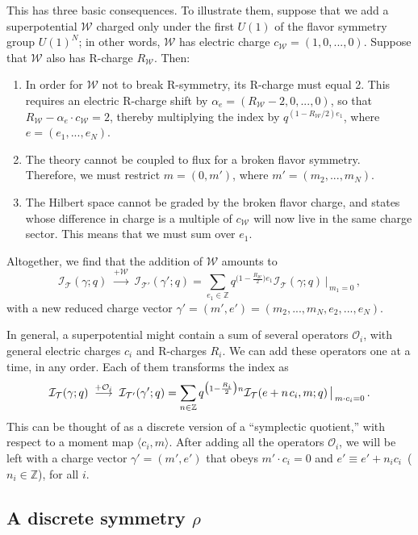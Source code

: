 \documentclass[11pt,letterpaper]{article}
\numberwithin{equation}{section}
\newcommand{\be}{\begin{equation}}
\newcommand{\ee}{\end{equation}}
\newcommand{\Z}{{\mathbb Z}}
\newcommand{\CI}{\mathcal{I}}
\newcommand{\CO}{\mathcal{O}}
\newcommand{\CT}{\mathcal{T}}
\newcommand{\CW}{\mathcal{W}}
\begin{document}
This has three basic consequences. To illustrate them, suppose that we add a superpotential $\CW$ charged only under the first $U(1)$ of the flavor symmetry group $U(1)^N$; in other words, $\CW$ has electric charge $c_\CW = (1,0,...,0)$. Suppose that $\CW$ also has R-charge $R_\CW$. Then:
%
\begin{enumerate}

\item In order for $\CW$ not to break R-symmetry, its R-charge must equal 2. This requires an electric R-charge shift by $\alpha_e = (R_\CW-2,0,...,0)$, so that $R_\CW - \alpha_e\cdot c_\CW=2$, thereby multiplying the index by $q^{(1-R_\CW/2)e_1}$, where $e = (e_1,...,e_N)$.

\item The theory cannot be coupled to flux for a broken flavor symmetry. Therefore, we must restrict $m=(0,m')$, where $m'=(m_2,...,m_N)$.

\item The Hilbert space cannot be graded by the broken flavor charge, and states whose difference in charge is a multiple of $c_\CW$ will now live in the same charge sector. This means that we must sum over $e_1$.

\end{enumerate}
%
Altogether, we find that the addition of $\CW$ amounts to
%
\be \CI_\CT(\gamma;q)\;\overset{+\CW}{\longrightarrow}\; \CI_{\CT'}(\gamma';q) = \sum_{e_1\in \Z}q^{\big(1-\frac{R_\CW}{2}\big)e_1} \CI_\CT(\gamma;q)\,\big|_{\,m_1=0}\,, \ee
%
with a new reduced charge vector $\gamma' = (m',e') = (m_2,...,m_N,e_2,...,e_N)$.

In general, a superpotential might contain a sum of several operators $\CO_i$, with general electric charges $c_i$ and R-charges $R_i$. We can add these operators one at a time, in any order. Each of them transforms the index as
%
\be \CI_\CT(\gamma;q)\;\overset{+\CO_i}{\longrightarrow}\; \CI_{\CT'}(\gamma';q) = \sum_{n\in \Z} q^{\big(1-\frac{R_i}{2}\big)n}\CI_\CT(e+n\hspace{.04cm}c_i,m;q)\,\big|_{\,m\cdot c_i = 0}\,. \ee
%
This can be thought of as a discrete version of a ``symplectic quotient,'' with respect to a moment map $\langle c_i, m \rangle$. After adding all the operators $\CO_i$, we will be left with a charge vector $\gamma'=(m',e')$ that obeys $m'\cdot c_i = 0$ and $e'\equiv e'+n_ic_i$\, ($n_i\in \Z$), for all $i$.



\subsection{A discrete symmetry $\rho$}
\label{sec:kappa}
\end{document}
